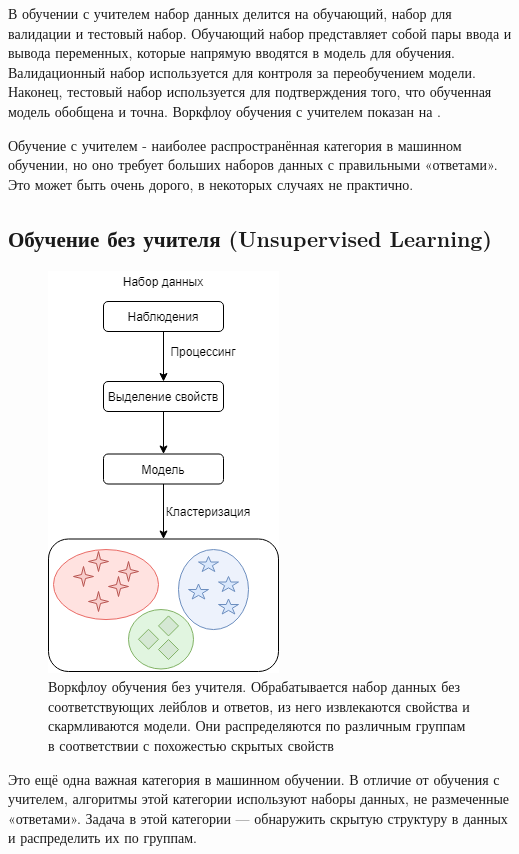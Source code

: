 В обучении с учителем набор данных делится на обучающий, набор для валидации и тестовый набор. Обучающий набор представляет собой пары ввода и вывода переменных, которые напрямую вводятся в модель для обучения. Валидационный набор используется для контроля за переобучением модели. Наконец, тестовый набор используется для подтверждения того, что обученная модель обобщена и точна. Воркфлоу обучения с учителем показан на .

Обучение с учителем - наиболее распространённая категория в машинном обучении, но оно требует больших наборов данных с правильными «ответами». Это может быть очень дорого, в некоторых случаях не практично.


\subsection{Обучение без учителя (Unsupervised Learning)}

\begin{figure}[ht!]
	\center
	\includegraphics [scale=0.60] {my_folder/images/ch1/unsupervised-learning.png}
	\caption{Воркфлоу обучения без учителя. Обрабатывается набор данных без соответствующих лейблов и ответов, из него извлекаются свойства и скармливаются модели. Они распределяются по различным группам в соответствии с похожестью скрытых свойств}
	\label{fig:unsupervised-learning}
\end{figure}

Это ещё одна важная категория в машинном обучении.
В отличие от обучения с учителем, алгоритмы этой категории используют наборы данных, не размеченные «ответами». Задача в этой категории --- обнаружить скрытую структуру в данных и распределить их по группам.

